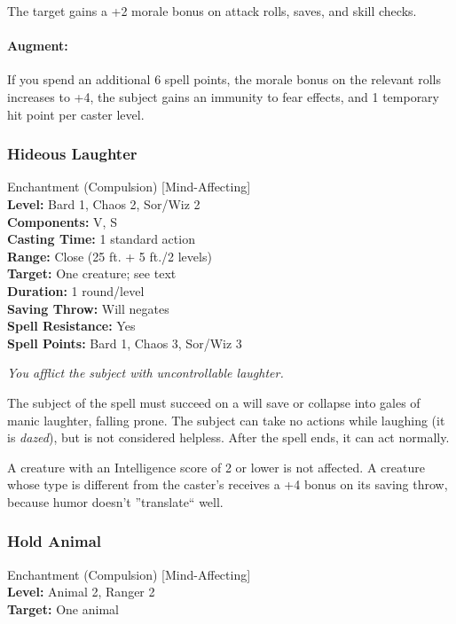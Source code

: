 The target gains a +2 morale bonus on attack rolls, saves, and skill checks.

\paragraph{Augment:} If you spend an additional 6 spell points, the morale bonus on the relevant rolls
increases to +4, the subject gains an immunity to fear effects, and 1 temporary hit point per caster level.
\subsubsection{Hideous Laughter}
\label{Spell:HideousLaughter}
Enchantment (Compulsion) [Mind-Affecting]
\\ \textbf{Level:} Bard 1, Chaos 2, Sor/Wiz 2
\\ \textbf{Components:} V, S
\\ \textbf{Casting Time:} 1 standard action
\\ \textbf{Range:} Close (25 ft. + 5 ft./2 levels)
\\ \textbf{Target:} One creature; see text
\\ \textbf{Duration:} 1 round/level
\\ \textbf{Saving Throw:} Will negates
\\ \textbf{Spell Resistance:} Yes
\\ \textbf{Spell Points:} Bard 1, Chaos 3, Sor/Wiz 3

\emph{You afflict the subject with uncontrollable laughter.} 

The subject of the spell must succeed on a will save or collapse into gales of manic laughter, falling prone. 
The subject can take no actions while laughing (it is \emph{dazed}), but is not considered helpless. After the spell ends, it can act normally.

A creature with an Intelligence score of 2 or lower is not affected. 
A creature whose type is different from the caster's receives a +4 bonus on its saving throw, because humor doesn't ''translate`` well.

\subsubsection{Hold Animal}
\label{Spell:HoldAnimal}
Enchantment (Compulsion) [Mind-Affecting]
\\ \textbf{Level:} Animal 2, Ranger 2
\\ \textbf{Target:} One animal

